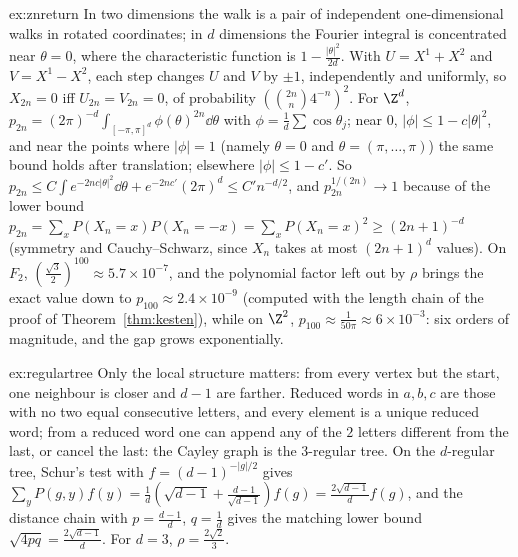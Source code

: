 \begin{solution}{ex:znreturn}
\idea In two dimensions the walk is a pair of independent one-dimensional walks in rotated coordinates; in $d$ dimensions the Fourier integral is concentrated near $\theta=0$, where the characteristic function is $1-\frac{|\theta|^2}{2d}$.
\writeup With $U=X^1+X^2$ and $V=X^1-X^2$, each step changes $U$ and $V$ by $\pm1$, independently and uniformly, so $X_{2n}=0$ iff $U_{2n}=V_{2n}=0$, of probability $(\binom{2n}n4^{-n})^2$. For $\Z^d$, $p_{2n}=(2\pi)^{-d}\int_{[-\pi,\pi]^d}\phi(\theta)^{2n}\dd\theta$
with $\phi=\frac1d\sum\cos\theta_j$; near $0$, $|\phi|\le1-c|\theta|^2$, and near the points where $|\phi|=1$ (namely $\theta=0$ and $\theta=(\pi,\dots,\pi)$) the same bound holds after translation; elsewhere $|\phi|\le1-c'$. So
$p_{2n}\le C\int e^{-2nc|\theta|^2}\dd\theta+e^{-2nc'}(2\pi)^d\le C'n^{-d/2}$, and $p_{2n}^{1/(2n)}\to1$ because of the lower bound $p_{2n}=\sum_xP(X_n=x)P(X_n=-x)=\sum_xP(X_n=x)^2\ge(2n+1)^{-d}$ (symmetry and Cauchy--Schwarz, since $X_n$ takes at most $(2n+1)^d$ values). On $F_2$, $(\frac{\sqrt3}2)^{100}\approx5.7\times10^{-7}$, and the polynomial factor left out by $\rho$ brings the exact value down to $p_{100}\approx2.4\times10^{-9}$ (computed with the length chain of the proof of Theorem~\ref{thm:kesten}), while on $\Z^2$, $p_{100}\approx\frac1{50\pi}\approx6\times10^{-3}$: six orders of magnitude, and the gap grows exponentially.
\end{solution}

\begin{solution}{ex:regulartree}
\idea Only the local structure matters: from every vertex but the start, one neighbour is closer and $d-1$ are farther.
\writeup Reduced words in $a,b,c$ are those with no two equal consecutive letters, and every element is a unique reduced word; from a reduced word one can append any of the $2$ letters different from the last, or cancel the
last: the Cayley graph is the $3$-regular tree. On the $d$-regular tree, Schur's test with $f=(d-1)^{-|g|/2}$ gives $\sum_yP(g,y)f(y)=\frac1d(\sqrt{d-1}+\frac{d-1}{\sqrt{d-1}})f(g)=\frac{2\sqrt{d-1}}df(g)$, and the distance chain with
$p=\frac{d-1}d$, $q=\frac1d$ gives the matching lower bound $\sqrt{4pq}=\frac{2\sqrt{d-1}}d$. For $d=3$, $\rho=\frac{2\sqrt2}3$.
\end{solution}

